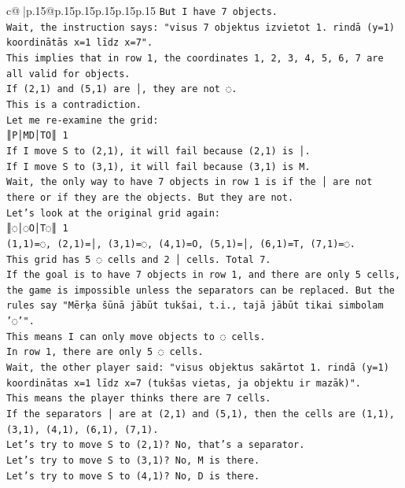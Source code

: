 \documentclass{article}
\begin{document}
{\begin{supertabular}{c@{$\;$}|p{.15\linewidth}@{}p{.15\linewidth}p{.15\linewidth}p{.15\linewidth}p{.15\linewidth}p{.15\linewidth}}
{{{\texttt{But I have 7 objects.} \\
\texttt{Wait, the instruction says: "visus 7 objektus izvietot 1. rindā (y=1) koordinātās x=1 līdz x=7".} \\
\texttt{This implies that in row 1, the coordinates 1, 2, 3, 4, 5, 6, 7 are all valid for objects.} \\
\texttt{If (2,1) and (5,1) are │, they are not ◌.} \\
\texttt{This is a contradiction.} \\
\texttt{Let me re{-}examine the grid:} \\
\texttt{║P│MD│TO║ 1} \\
\texttt{If I move S to (2,1), it will fail because (2,1) is │.} \\
\texttt{If I move S to (3,1), it will fail because (3,1) is M.} \\
\texttt{Wait, the only way to have 7 objects in row 1 is if the │ are not there or if they are the objects. But they are not.} \\
\texttt{Let's look at the original grid again:} \\
\texttt{║◌│◌O│T◌║ 1} \\
\texttt{(1,1)=◌, (2,1)=│, (3,1)=◌, (4,1)=O, (5,1)=│, (6,1)=T, (7,1)=◌.} \\
\texttt{This grid has 5 ◌ cells and 2 │ cells. Total 7.} \\
\texttt{If the goal is to have 7 objects in row 1, and there are only 5 cells, the game is impossible unless the separators can be replaced. But the rules say "Mērķa šūnā jābūt tukšai, t.i., tajā jābūt tikai simbolam '◌'".} \\
\texttt{This means I can only move objects to ◌ cells.} \\
\texttt{In row 1, there are only 5 ◌ cells.} \\
\texttt{Wait, the other player said: "visus objektus sakārtot 1. rindā (y=1) koordinātas x=1 līdz x=7 (tukšas vietas, ja objektu ir mazāk)".} \\
\texttt{This means the player thinks there are 7 cells.} \\
\texttt{If the separators │ are at (2,1) and (5,1), then the cells are (1,1), (3,1), (4,1), (6,1), (7,1).} \\
\texttt{Let's try to move S to (2,1)? No, that's a separator.} \\
\texttt{Let's try to move S to (3,1)? No, M is there.} \\
\texttt{Let's try to move S to (4,1)? No, D is there.} \\
}}}
\end{supertabular}}
\end{document}
